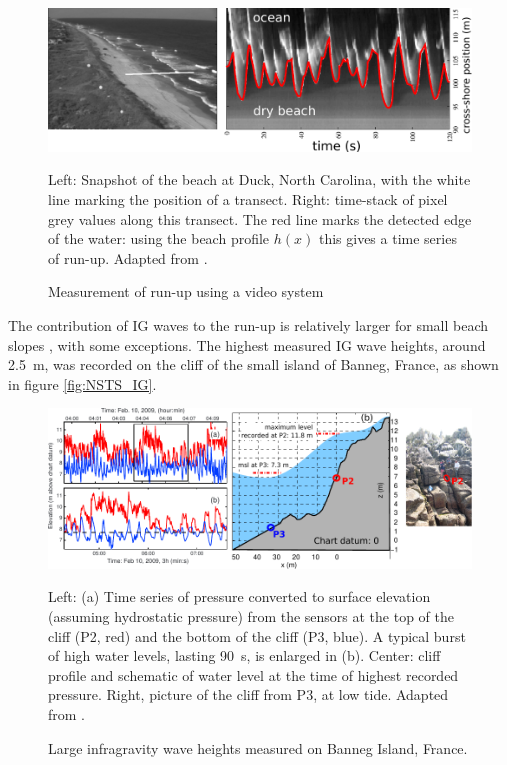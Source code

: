 \begin{figure}[htb]
\centerline{\includegraphics[width=\textwidth]{FIGS_CH_SURF/runup_Stockdon.pdf}}
  \caption{Measurement of run-up using a video system}
    {Left: Snapshot of the beach at Duck, North Carolina, with the white line marking the position of a transect. Right: 
    time-stack of pixel grey values along this transect. The red line marks the detected edge of the water: using the beach profile $h(x)$ this 
    gives a time series of run-up. Adapted 
    from \cite{Stockdon&al.2006}.}
\label{fig:video_runup}
\end{figure}

The contribution of IG waves to the run-up is relatively larger for small beach slopes \citep{Stockdon&al.2006}, with some exceptions. 
The highest measured IG wave heights, around 2.5~m, was recorded on the cliff 
of the small island of Banneg, France, as shown in figure \ref{fig:NSTS_IG}. 
\begin{figure}[htb]
\centerline{\includegraphics[width=\textwidth]{FIGS_CH_SURF/Banneg_IG.pdf}}
  \caption{Large infragravity wave heights measured on Banneg Island, France.}
    {Left: (a) Time series of pressure converted to surface elevation (assuming hydrostatic pressure) from the sensors at the top of the cliff (P2, red) and the bottom of the cliff (P3, blue). 
    A typical burst of high water levels, lasting 90~s, is enlarged in (b). Center: cliff profile and schematic of water level at the time
    of highest recorded pressure. Right, picture of the cliff from P3, at low tide. Adapted 
    from \cite{Sheremet&al.2014}.}
\label{fig:Banneg_IG}
\end{figure}



